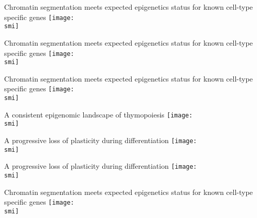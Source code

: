 \documentclass[10pt]{beamer}
\def\smi{out/ln/updir/mw-gcthesis-oral/library.bib}
\begin{document}
    \begin{frame}{Chromatin segmentation meets expected epigenetics status for known cell-type specific genes} 
      \def\smi{out/ln/updir/mw-gcthesis-oral/ink/chromatin-states/genome-view/hematopoiesis/hsc-t-markers.pdf}
      \texttt{[image: \\smi]}
    \end{frame}
    \begin{frame}{Chromatin segmentation meets expected epigenetics status for known cell-type specific genes} 
      \def\smi{out/ln/updir/mw-gcthesis-oral/ink/chromatin-states/genome-view/hematopoiesis/b-marker.pdf}
      \texttt{[image: \\smi]}
    \end{frame}
    \begin{frame}{Chromatin segmentation meets expected epigenetics status for known cell-type specific genes} 
      \def\smi{out/ln/updir/mw-gcthesis-oral/ink/chromatin-states/genome-view/hematopoiesis/b-myeloid-markers.pdf}
      \texttt{[image: \\smi]}
    \end{frame}
    \begin{frame}{A consistent epigenomic landscape of thymopoiesis}
      \def\smi{out/ln/updir/mw-gcthesis-oral/ink/chromatin-states/both-mca.pdf}
      \texttt{[image: \\smi]}
    \end{frame}
    \begin{frame}{A progressive loss of plasticity during differentiation}
      \def\smi{out/ln/updir/mw-gcthesis-oral/ink/chromatin-states/riverplot-model.pdf}
      \texttt{[image: \\smi]}
    \end{frame}
    \begin{frame}{A progressive loss of plasticity during differentiation}
      \def\smi{out/ln/updir/mw-gcthesis-oral/ink/chromatin-states/riverplot-heatmap.pdf}
      \texttt{[image: \\smi]}
    \end{frame}
    \begin{frame}{Chromatin segmentation meets expected epigenetics status for known cell-type specific genes}
      \def\smi{out/ln/updir/mw-gcthesis-oral/ink/chromatin-states/genome-view/t-lineage/1.pdf}
      \texttt{[image: \\smi]}
    \end{frame}
\end{document}

